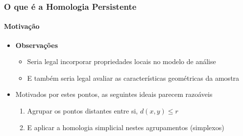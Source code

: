 \documentclass[11pt]{beamer}
\begin{document}
    \begin{frame}
        \frametitle{O que é a Homologia Persistente}
        \framesubtitle{Motivação}

        \begin{itemize}

            \item
                \textbf{Observações} \\[0.4cm]
                \begin{itemize}
                    \item
                        Seria legal incorporar propriedades locais
                        no modelo de análise\\[0.2cm]

                    \item
                        E também seria legal avaliar as características
                        geométricas da amostra\\[0.4cm]

                \end{itemize}

            \item
                Motivados por estes pontos,
                as seguintes ideais parecem razoáveis \\[0.4cm]
                \begin{enumerate}
                    \item
                        Agrupar os pontos distantes entre si, $d(x,y) \leq r$\\[0.2cm]

                    \item
                        E aplicar a homologia simplicial nestes agrupamentos (simplexos)
                \end{enumerate}
        \end{itemize}


    \end{frame}
\end{document}
